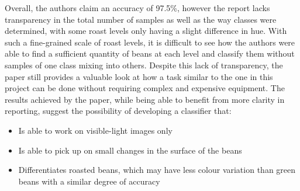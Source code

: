 Overall, the authors claim an accuracy of 97.5\%, however the report lacks
transparency in the total number of samples as well as the way classes were
determined, with some roast levels only having a slight difference in hue. With
such a fine-grained scale of roast levels, it is difficult to see how the authors
were able to find a sufficient quantity of beans at each level and classify them
without samples of one class mixing into others. Despite this lack of
transparency, the paper still provides a valuable look at how a task similar to the
one in this project can be done without requiring complex and expensive equipment.
The results achieved by the paper, while being able to benefit from more clarity
in reporting, suggest the possibility of developing a classifier that:
\begin{itemize}
	\item Is able to work on visible-light images only

	\item Is able to pick up on small changes in the surface of the beans

	\item Differentiates roasted beans, which may have less colour variation than
		green beans with a similar degree of accuracy
\end{itemize}


